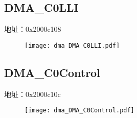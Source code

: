 \subsection{DMA\_C0LLI}
\label{dma-DMA-C0LLI}
地址：0x2000c108
 \begin{figure}[H]
\texttt{[image: dma\_DMA\_C0LLI.pdf]}
\end{figure}

\subsection{DMA\_C0Control}
\label{dma-DMA-C0Control}
地址：0x2000c10c
 \begin{figure}[H]
\texttt{[image: dma\_DMA\_C0Control.pdf]}
\end{figure}

